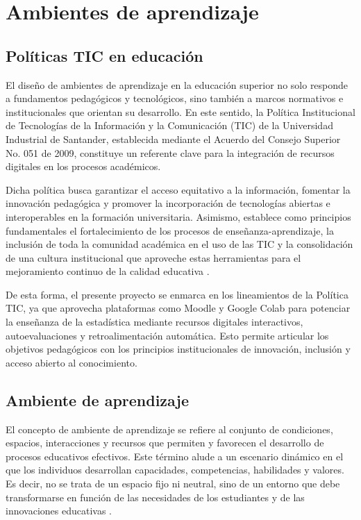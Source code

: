 \documentclass[letter,oneside,12pt,spanish]{report}
\begin{document}
\section{Ambientes de aprendizaje}

\subsection{Políticas TIC en educación}

El diseño de ambientes de aprendizaje en la educación superior no solo responde a fundamentos pedagógicos y tecnológicos, sino también a marcos normativos e institucionales que orientan su desarrollo. En este sentido, la Política Institucional de Tecnologías de la Información y la Comunicación (TIC) de la Universidad Industrial de Santander, establecida mediante el Acuerdo del Consejo Superior No. 051 de 2009, constituye un referente clave para la integración de recursos digitales en los procesos académicos.

Dicha política busca garantizar el acceso equitativo a la información, fomentar la innovación pedagógica y promover la incorporación de tecnologías abiertas e interoperables en la formación universitaria. Asimismo, establece como principios fundamentales el fortalecimiento de los procesos de enseñanza-aprendizaje, la inclusión de toda la comunidad académica en el uso de las TIC y la consolidación de una cultura institucional que aproveche estas herramientas para el mejoramiento continuo de la calidad educativa \parencite{uis2009}.

De esta forma, el presente proyecto se enmarca en los lineamientos de la Política TIC, ya que aprovecha plataformas como Moodle y Google Colab para potenciar la enseñanza de la estadística mediante recursos digitales interactivos, autoevaluaciones y retroalimentación automática. Esto permite articular los objetivos pedagógicos con los principios institucionales de innovación, inclusión y acceso abierto al conocimiento.

\subsection{Ambiente de aprendizaje}

El concepto de ambiente de aprendizaje se refiere al conjunto de condiciones, espacios, interacciones y recursos que permiten y favorecen el desarrollo de procesos educativos efectivos. Este término alude a un escenario dinámico en el que los individuos desarrollan capacidades, competencias, habilidades y valores. Es decir, no se trata de un espacio fijo ni neutral, sino de un entorno que debe transformarse en función de las necesidades de los estudiantes y de las innovaciones educativas \parencite{castro2019}.
\end{document}

